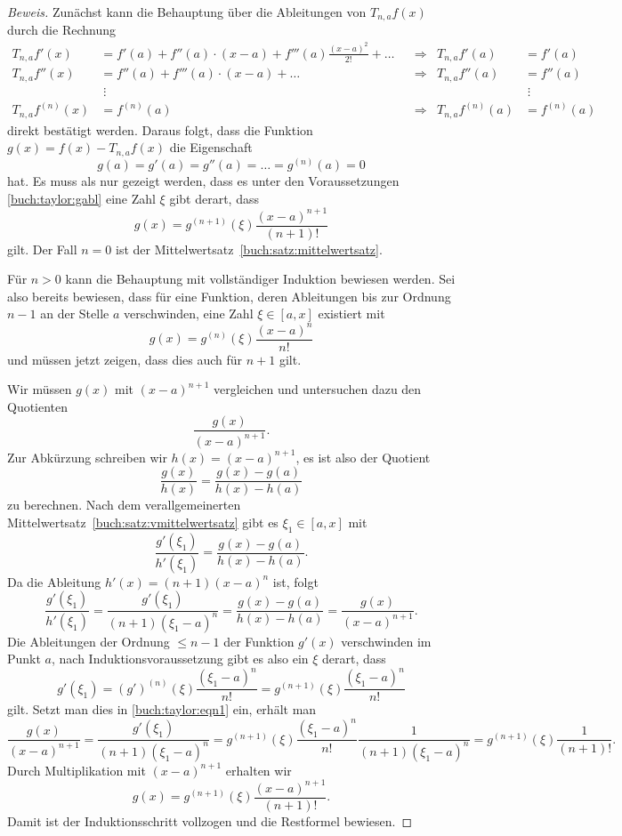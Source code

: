 \begin{proof}[Beweis]
Zunächst kann die Behauptung über die Ableitungen von $T_{n,a}f(x)$ durch
die Rechnung
\begin{align*}
T_{n,a}f'(x)
&=
f'(a) + f''(a) \cdot (x-a) + f'''(a)\frac{(x-a)^2}{2!} + \dots
&&\Rightarrow&
T_{n,a}f'(a) 
&=
f'(a)
\\
T_{n,a}f''(x)
&=
f''(a) + f'''(a) \cdot (x-a) + \dots
&&\Rightarrow&
T_{n,a}f''(a) 
&=
f''(a)
\\
&\;\vdots&&&&\;\vdots
\\
T_{n,a}f^{(n)}(x)
&=
f^{(n)}(a)
&&\Rightarrow&
T_{n,a}f^{(n)}(a)
&=
f^{(n)}(a)
\end{align*}
direkt bestätigt werden.
Daraus folgt, dass die Funktion $g(x) = f(x) - T_{n,a}f(x)$ die Eigenschaft
\begin{equation}
g(a) = g'(a) = g''(a) = \dots = g^{(n)}(a)=0
\label{buch:taylor:gabl}
\end{equation}
hat.
Es muss als nur gezeigt werden, dass es unter den Voraussetzungen
\eqref{buch:taylor:gabl} eine Zahl $\xi$ gibt derart, dass
\[
g(x) = g^{(n+1)}(\xi)\frac{(x-a)^{n+1}}{(n+1)!}
\]
gilt.
Der Fall $n=0$ ist der Mittelwertsatz~\ref{buch:satz:mittelwertsatz}.

Für $n>0$ kann die Behauptung mit vollständiger Induktion bewiesen werden.
Sei also bereits bewiesen, dass für eine Funktion, deren Ableitungen bis
zur Ordnung $n-1$ an der Stelle $a$ verschwinden, eine Zahl $\xi\in[a,x]$
existiert mit
\[
g(x) = g^{(n)}(\xi)\frac{(x-a)^n}{n!}
\]
und müssen jetzt zeigen, dass dies auch für $n+1$ gilt.

Wir müssen $g(x)$ mit $(x-a)^{n+1}$ vergleichen und untersuchen
dazu den Quotienten
\[
\frac{g(x)}{(x-a)^{n+1}}.
\]
Zur Abkürzung schreiben wir $h(x) = (x-a)^{n+1}$, es ist also der
Quotient 
\[
\frac{g(x)}{h(x)}
=
\frac{g(x)-g(a)}{h(x)-h(a)}
\]
zu berechnen.
Nach dem verallgemeinerten Mittelwertsatz~\ref{buch:satz:vmittelwertsatz}
gibt es $\xi_1\in[a,x]$ mit
\[
\frac{g'(\xi_1)}{h'(\xi_1)}
=
\frac{g(x)-g(a)}{h(x)-h(a)}.
\]
Da die Ableitung $h'(x)=(n+1)(x-a)^n$ ist, folgt
\begin{equation}
\frac{g'(\xi_1)}{h'(\xi_1)}
=
\frac{g'(\xi_1)}{(n+1) (\xi_1-a)^n}
=
\frac{g(x)-g(a)}{h(x)-h(a)}
=
\frac{g(x)}{(x-a)^{n+1}}.
\label{buch:taylor:eqn1}
\end{equation}
Die Ableitungen der Ordnung $\le n-1$ der Funktion $g'(x)$ verschwinden
im Punkt $a$, nach Induktionsvoraussetzung gibt es also ein $\xi$ derart,
dass
\[
g'(\xi_1)
=
(g')^{(n)}(\xi) \frac{(\xi_1-a)^{n}}{n!}
=
g^{(n+1)}(\xi)\frac{(\xi_1-a)^n}{n!}
\]
gilt.
Setzt man dies in \eqref{buch:taylor:eqn1} ein, erhält man
\[
\frac{g(x)}{(x-a)^{n+1}}
=
\frac{g'(\xi_1)}{(n+1)(\xi_1-a)^n}
=
g^{(n+1)}(\xi)\frac{(\xi_1-a)^n}{n!} \frac{1}{(n+1)(\xi_1-a)^n}
=
g^{(n+1)}(\xi)\frac{1}{(n+1)!}.
\]
Durch Multiplikation mit $(x-a)^{n+1}$ erhalten wir
\[
g(x) = g^{(n+1)}(\xi)\frac{(x-a)^{n+1}}{(n+1)!}.
\]
Damit ist der Induktionsschritt vollzogen und die Restformel bewiesen.
\end{proof}

